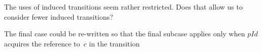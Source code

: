 
\begin{improve}
The uses of induced transitions seem rather restricted.  Does that allow us to
consider fewer induced transitions?  

The final case could be re-written so that the final subcase applies only when
$pId$ acquires the reference to~$c$ in the transition
\end{improve}









